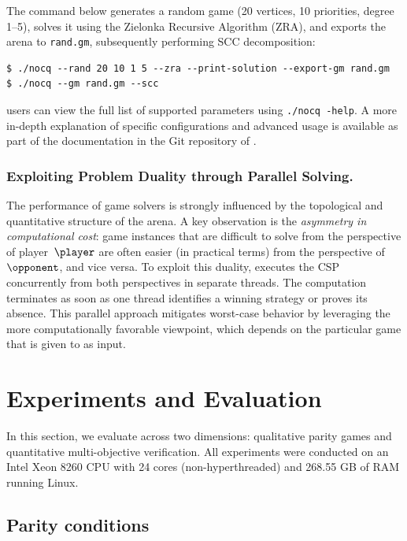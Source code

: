 \documentclass[a4paper,UKenglish,cleveref, autoref, thm-restate, anonymous]{lipics-v2021}
\begin{document}
The command below generates a random game (20 vertices, 10 priorities, degree 1–5), solves it using the Zielonka Recursive Algorithm (ZRA), and exports the arena to \texttt{rand.gm}, subsequently performing SCC decomposition:

\begin{lstlisting}
$ ./nocq --rand 20 10 1 5 --zra --print-solution --export-gm rand.gm
$ ./nocq --gm rand.gm --scc
\end{lstlisting}

\noindent \nocq users can view the full list of supported parameters using \texttt{./nocq -\-help}. A more in-depth explanation of specific configurations and advanced usage is available as part of the documentation in the Git repository of \nocq. 

\subsubsection{Exploiting Problem Duality through Parallel Solving.}

The performance of game solvers is strongly influenced by the topological and quantitative structure of the arena. A key observation is the \emph{asymmetry in computational cost}: game instances that are difficult to solve from the perspective of player~$\player$ are often easier (in practical terms) from the perspective of $\opponent$, and vice versa.
%
To exploit this duality, \nocq executes the CSP concurrently from both perspectives in separate threads. The computation terminates as soon as one thread identifies a winning strategy or proves its absence. This parallel approach mitigates worst-case behavior by leveraging the more computationally favorable viewpoint, which depends on the particular game that is given to \nocq as input. 


\section{Experiments and Evaluation}\label{sec:experiments}

In this section, we evaluate \nocq across two dimensions: qualitative parity games and quantitative multi-objective verification. All experiments were conducted on an Intel Xeon 8260 CPU with 24 cores (non-hyperthreaded) and 268.55 GB of RAM running Linux.


\subsection{Parity conditions}
\end{document}
